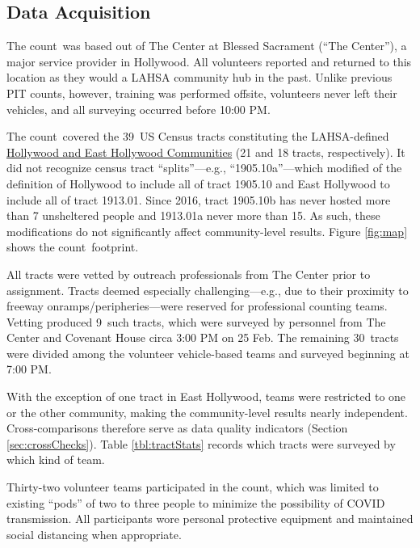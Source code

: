 \documentclass[11pt,twocolumn]{article}
\def\Count{count}
\def\ntracts{39}
\def\nprof{9}
\def\nvol{30}
\def\resp{respectively}
\begin{document}
\subsection{Data Acquisition}
\label{sec:acquisition}

The \Count\ was based out of The Center at Blessed Sacrament (``The Center''), a major service 
provider in Hollywood. All volunteers reported and returned to this location as they would a LAHSA 
community hub in the past. Unlike previous PIT counts, however, training was performed offsite, 
volunteers never left their vehicles, and all surveying occurred before 10:00 PM.

The \Count\ covered the \ntracts\ US Census tracts constituting the LAHSA-defined 
\href{https://www.lahsa.org/data?id=45-2020-homeless-count-by-community-city}{Hollywood 
and East Hollywood Communities} (21 and 18 tracts, \resp). It did not recognize census 
tract ``splits''---e.g., ``1905.10a''---which modified of the definition of Hollywood to include 
all of tract 1905.10 and East Hollywood to include all of tract 1913.01. Since 2016, tract 1905.10b 
has never hosted more than 7 unsheltered people and 1913.01a never more than 15. As such,
these modifications do not significantly affect community-level results.
Figure \ref{fig:map} shows the \Count\ footprint.

All tracts were vetted by outreach professionals from The Center prior to assignment. Tracts 
deemed especially challenging---e.g., due to their proximity to freeway onramps/peripheries---were 
reserved for professional counting teams. Vetting produced \nprof\ such tracts, which were surveyed 
by personnel from The Center and Covenant House circa 3:00 PM on 25 Feb. The remaining \nvol\ 
tracts were divided among the volunteer vehicle-based teams and surveyed beginning at 7:00 PM. 

With 
the exception of one tract in East Hollywood, teams were restricted to one or the other community, 
making the community-level results nearly independent. Cross-comparisons therefore serve as data 
quality indicators (Section \ref{sec:crossChecks}). Table \ref{tbl:tractStats} records which tracts were 
surveyed by which kind of team. 

Thirty-two volunteer teams participated in the \Count, which was limited to existing ``pods'' of two 
to three people to minimize the possibility of COVID transmission. 
All participants wore 
personal protective equipment and maintained social distancing when appropriate.
\end{document}

